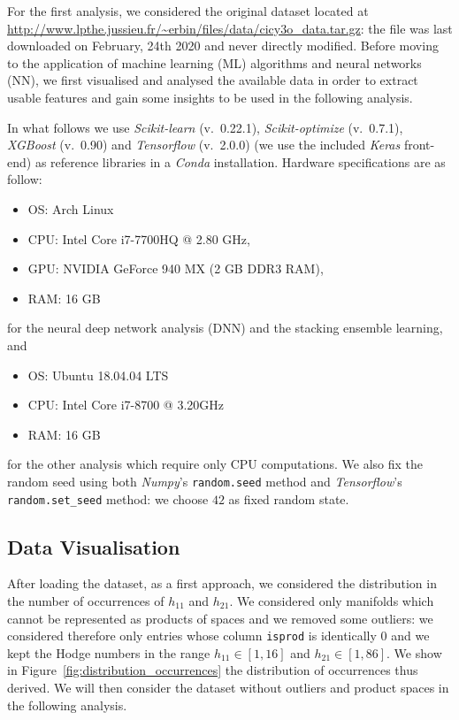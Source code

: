 For the first analysis, we considered the original dataset located at \url{http://www.lpthe.jussieu.fr/~erbin/files/data/cicy3o_data.tar.gz}: the file was last downloaded on February, 24th 2020 and never directly modified. Before moving to the application of machine learning (ML) algorithms and neural networks (NN), we first visualised and analysed the available data in order to extract usable features and gain some insights to be used in the following analysis.

In what follows we use \textit{Scikit-learn} (v.\ 0.22.1), \textit{Scikit-optimize} (v.\ 0.7.1), \textit{XGBoost} (v.\ 0.90) and \textit{Tensorflow} (v.\ 2.0.0) (we use the included \textit{Keras} front-end) as reference libraries in a \textit{Conda} installation. Hardware specifications are as follow:
\begin{itemize}
    \item OS: Arch Linux
    \item CPU: Intel Core i7-7700HQ @ 2.80 GHz,
    \item GPU: NVIDIA GeForce 940 MX (2 GB DDR3 RAM),
    \item RAM: 16 GB
\end{itemize}
for the neural deep network analysis (DNN) and the stacking ensemble learning, and
\begin{itemize}
    \item OS: Ubuntu 18.04.04 LTS
    \item CPU: Intel Core i7-8700 @ 3.20GHz
    \item RAM: 16 GB
\end{itemize}
for the other analysis which require only CPU computations. We also fix the random seed using both \textit{Numpy}'s \texttt{random.seed} method and \textit{Tensorflow}'s \texttt{random.set\_seed} method: we choose $42$ as fixed random state.

\subsection{Data Visualisation}

    After loading the dataset, as a first approach, we considered the distribution in the number of occurrences of $h_{11}$ and $h_{21}$. We considered only manifolds which cannot be represented as products of spaces and we removed some outliers: we considered therefore only entries whose column \texttt{isprod} is identically $0$ and we kept the Hodge numbers in the range $h_{11} \in \left[ 1, 16 \right]$ and $h_{21} \in \left[1, 86 \right]$. We show in Figure~\ref{fig:distribution_occurrences} the distribution of occurrences thus derived. We will then consider the dataset without outliers and product spaces in the following analysis.
    
